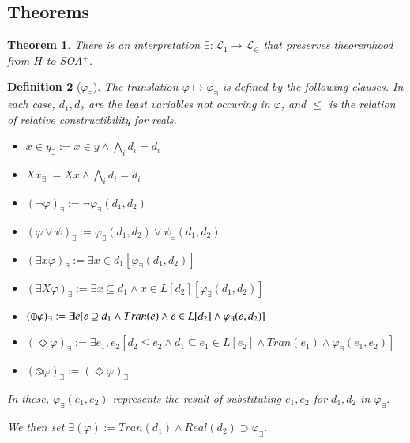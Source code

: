 \documentclass{article}
\newcommand\D{\circledbar}
\newtheorem{theorem}{Theorem}
\newtheorem{definition}[theorem]{Definition}
\begin{document}
\subsection*{Theorems}
\begin{theorem} 
    There is an interpretation $\exists : \mathcal{L}_1 \to \mathcal{L}_\in$ that preserves 
    theoremhood from $H$ to SOA$^+$.
    \end{theorem}
    \begin{definition}[$\varphi_\exists$]
        The translation $\varphi \mapsto \varphi_\exists$ is defined by the following clauses.
        In each case, $d_1, d_2$ are the least variables not occuring in $\varphi$, and $\leq$ is the relation of relative constructibility for 
        reals.
        \begin{itemize}
            \item $x \in y_\exists := x \in y \wedge \bigwedge_i d_i = d_i$
            \item $Xx_\exists := Xx \wedge \bigwedge_i d_i = d_i$
            \item $(\neg \varphi)_\exists := \neg \varphi_\exists(d_1, d_2)$
            \item $(\varphi \vee \psi)_\exists := \varphi_\exists(d_1, d_2) \vee \psi_\exists(d_1, d_2)$
            \item $(\exists x \varphi)_\exists := \exists x \in d_1[ \varphi_\exists(d_1, d_2)]$
            \item $(\exists X \varphi)_\exists := \exists x \subseteq d_1 \wedge x \in L[d_2] [ \varphi_\exists(d_1, d_2)]$
            \item $(\D \varphi)_\exists := \exists e[e \supseteq d_1 \wedge Tran(e) \wedge e \in L[d_2] \wedge \varphi_\exists(e, d_2)]$
            \item $(\Diamond \varphi)_\exists := \exists e_1, e_2[d_2 \leq e_2 \wedge d_1 \subseteq e_1 \in L[e_2] \wedge Tran(e_1) \wedge \varphi_\exists(e_1, e_2)]$
            \item $(\circledbslash \varphi)_\exists := (\Diamond \varphi)_\exists$
        \end{itemize}
        In these, $\varphi_\exists(e_1, e_2)$ represents the result of substituting $e_1, e_2$ for $d_1, d_2$ in
        $\varphi_\exists$.
    
        We then set $\exists(\varphi) := Tran(d_1) \wedge Real(d_2) \supset \varphi_\exists$.
    \end{definition}
\end{document}
